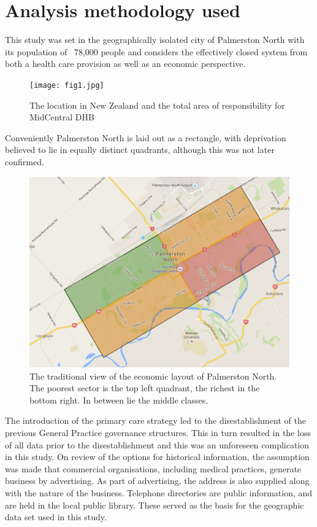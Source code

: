 \documentclass[11pt,a4paper]{article}
\begin{document}
\pagebreak
\section{Analysis methodology used}
This study was set in the geographically isolated city of Palmerston North with its population of ~78,000 people and considers the effectively closed system from both a health care provision as well as an economic perspective.\\

\begin{figure}[htp]
\centering
\texttt{[image: fig1.jpg]}
\caption{The location in New Zealand and the total area of responsibility for MidCentral DHB}
\label{MidCentral District Health Board}
\end{figure}

Conveniently Palmerston North is laid out as a rectangle, with deprivation believed to lie in equally distinct quadrants, although this was not later confirmed.\\

\begin{figure}[htp]
\centering
\includegraphics[scale=0.20]{fig2.png}
\caption{The traditional view of the economic layout of Palmerston North. The poorest sector is the top left quadrant, the richest in the bottom right. In between lie the middle classes.}
\label{Traditional view of the spatial economics of Palmerston North City}
\end{figure}

The introduction of the primary care strategy led to the disestablishment of the previous General Practice governance structures. This in turn resulted in the loss of all data prior to the disestablishment and this was an unforeseen complication in this study. On review of the options for historical information, the assumption was made that commercial organisations, including medical practices, generate business by advertising. As part of advertising, the address is also supplied along with the nature of the business. Telephone directories are public information, and are held in the local public library. These served as the basis for the geographic data set used in this study.\\
\end{document}

